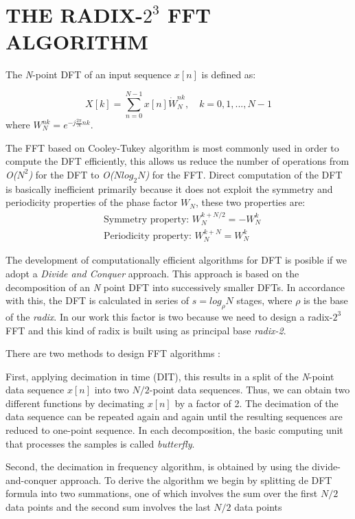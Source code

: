 \documentclass[journal,comsoc]{IEEEtran}
\begin{document}
\section{THE RADIX-$2^3$ FFT ALGORITHM}
The \textit{N}-point DFT of an input sequence $x[n]$ is defined as:

\begin{equation}
	X[k] = \sum_{n=0}^{N-1} x[n] \dot W_N^{nk}, \quad k=0,1,...,N-1
\end{equation}
where $W_N^{nk} = e^{-j\frac{2\pi}{N} nk}$. 

The FFT based on Cooley-Tukey algorithm is most commonly used in order to compute the DFT efficiently, this allows us reduce the number of operations from \textit{O($N^2$)} for the DFT to \textit{O($Nlog_2N$)} for the FFT. Direct computation of the DFT is basically inefficient primarily because it does not exploit the symmetry and periodicity properties of the phase factor $W_N$, these two properties are:
\begin{align}
	&\text{Symmetry property: } W_N^{k+N/2} = -W_N^k	\\
	&\text{Periodicity property: } W_N^{k+N} = W_N^k
\end{align}

The development of computationally efficient algorithms for DFT is posible if we adopt a \textit{Divide and Conquer} approach. This approach is based on the decomposition of an \textit{N} point DFT into successively smaller DFTs. In accordance with this, the DFT is calculated in series of $s=log_\rho N$ stages, where $\rho$ is the base of the \textit{radix}. In our work this factor is two because we need to design a radix-$2^3$ FFT and this kind of radix is built using as principal base \textit{radix-2}.

There are two methods to design FFT algorithms \cite{proakis_digital_nodate,oppenheim_tratamiento_2011}: 

First, applying decimation in time (DIT), this results in a split of the \textit{N}-point data sequence $x[n]$ into two $N/2$-point data sequences. Thus, we can obtain two different functions by decimating $x[n]$ by a factor of 2. The decimation of the data sequence can be repeated again and again until the resulting sequences are reduced to one-point sequence. In each decomposition, the basic computing unit that processes the samples is called \textit{butterfly}.

Second, the decimation in frequency algorithm, is obtained by using the divide-and-conquer approach. To derive the algorithm we begin by splitting de DFT formula into two summations, one of which involves the sum over the first $N/2$ data points and the second sum involves the last $N/2$ data points  
\end{document}
